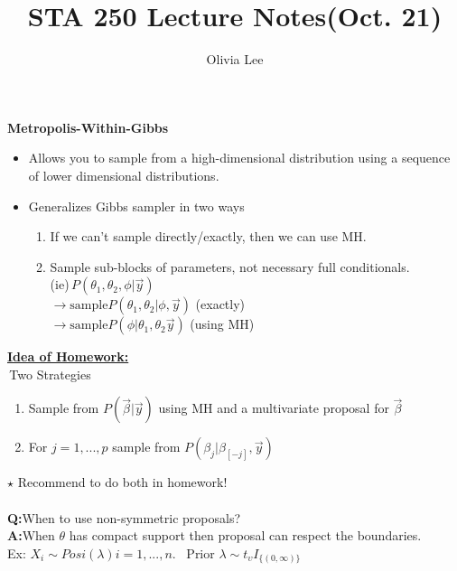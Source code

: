 \documentclass[11pt,a4paper]{article}
\begin{document}
\title{\textbf{STA 250 Lecture Notes(Oct. 21)}}
\author{Olivia Lee}
\date{}
\maketitle
\noindent
\textbf{\Large Metropolis-Within-Gibbs}
\begin{itemize}
\item Allows you to sample from a high-dimensional distribution using a sequence of lower dimensional distributions.
\item Generalizes Gibbs sampler in two ways\begin{enumerate}
                                             \item If we can't sample directly/exactly, then we can use MH.
                                             \item Sample sub-blocks of parameters, not necessary full conditionals. \\
                                             (ie)\,$P(\theta_1,\theta_2,\phi | \overrightarrow{y})$\\
                                             $\rightarrow \text{sample}  P(\theta_1,\theta_2 | \phi, \overrightarrow{y})$ (exactly)\\
                                             $\rightarrow \text{sample}  P(\phi | \theta_1,\theta_2  \overrightarrow{y})$ (using MH)\\
                                             \end{enumerate}
\end{itemize}
\textbf{\underline{Idea of Homework:}}\\
$\,$Two Strategies\begin{enumerate}
  \item  Sample from $P(\overrightarrow{\beta}|\overrightarrow{y})$ using MH and a multivariate proposal for $\overrightarrow{\beta}$
  \item For $j=1,...,p$ sample from $P(\beta_j|\beta_{[-j]},\overrightarrow{y})$
\end{enumerate}
$\star$ Recommend to do both in homework!\\
\\
\textbf{Q:}When to use non-symmetric proposals?\\
\textbf{A:}When $\theta$ has compact support then proposal can respect the boundaries.\\
\indent Ex: $X_i\sim Posi(\lambda) i=1,...,n.$ $\,$ Prior $\lambda \sim t_\upsilon I_{\{(0,\infty)\}}$\\
\end{document}
